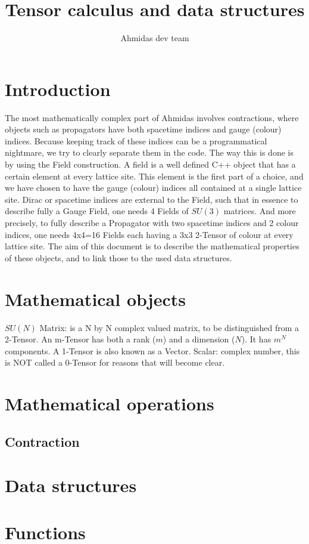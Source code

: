 \documentclass[a4paper,10pt]{article}
\title{Tensor calculus and data structures}
\author{Ahmidas dev team}
\begin{document}
\section{Introduction}
The most mathematically complex part of Ahmidas involves contractions, where objects such as propagators have both spacetime indices and gauge (colour) indices. Because keeping track of these indices can be a programmatical nightmare, we try to clearly separate them in the code. The way this is done is by using the Field construction. A field is a well defined C++ object that has a certain element at every lattice site. This element is the first part of a choice, and we have chosen to have the gauge (colour) indices all contained at a single lattice site. Dirac or spacetime indices are external to the Field, such that in essence to describe fully a Gauge Field, one needs 4 Fields of $SU(3)$ matrices. And more precisely, to fully describe a Propagator with two spacetime indices and 2 colour indices, one needs 4x4=16 Fields each having a 3x3 2-Tensor of colour at every lattice site. The aim of this document is to describe the mathematical properties of these objects, and to link those to the used data structures.
\section{Mathematical objects}
$SU(N)$ Matrix: is a N by N complex valued matrix, to be distinguished from a 2-Tensor.
An m-Tensor has both a rank ($m$) and a dimension ($N$). It has $m^{N}$ components.
A 1-Tensor is also known as a Vector.
Scalar: complex number, this is NOT called a 0-Tensor for reasons that will become clear.

\section{Mathematical operations}
\subsection{Contraction}
\section{Data structures}

\section{Functions}
\end{document}
